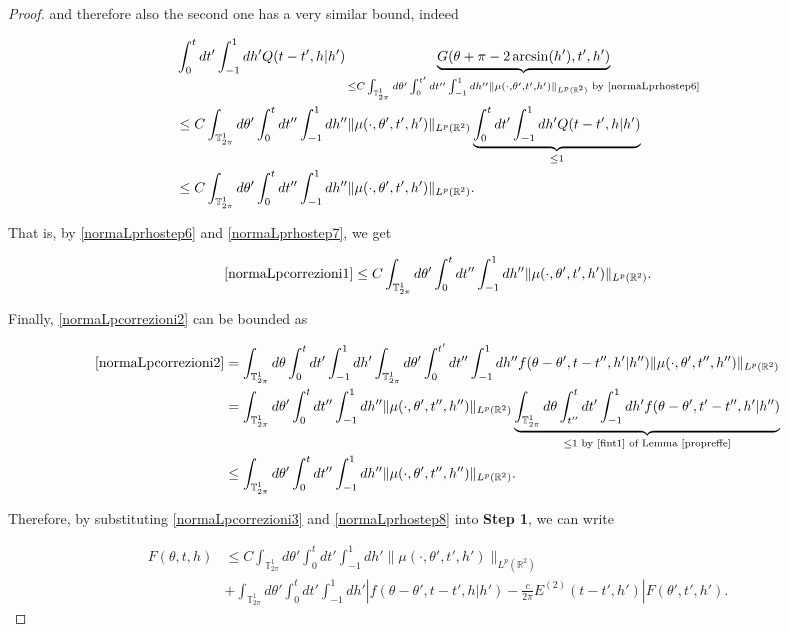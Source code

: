 \documentclass[a4paper,10pt,reqno]{amsart}
\numberwithin{equation}{subsection}
\numberwithin{figure}{subsection}
\begin{document}
\begin{proof}
and therefore also the second one has a very similar bound, indeed

\begin{align}
\nonumber&\int_0^tdt'\int_{-1}^1dh' Q(t-t',h|h')\underbrace{G(\theta+\pi-2\arcsin(h'),t',h')}_{\leq C\int_{\mathbb{T}^1_{2\pi}}d\theta'\int_0^{t'}dt''\int_{-1}^1dh''\|\mu(\cdot,\theta',t',h')\|_{L^p(\mathbb{R}^2)}\textrm{ by \eqref{normaLprhostep6}}}
\\
\nonumber&\leq C\int_{\mathbb{T}^1_{2\pi}}d\theta'\int_0^tdt''\int_{-1}^1dh''\|\mu(\cdot,\theta',t',h')\|_{L^p(\mathbb{R}^2)}\underbrace{\int_0^tdt'\int_{-1}^1dh' Q(t-t',h|h')}_{\leq1}
\\
\label{normaLprhostep7}&\leq C\int_{\mathbb{T}^1_{2\pi}}d\theta'\int_0^tdt''\int_{-1}^1dh''\|\mu(\cdot,\theta',t',h')\|_{L^p(\mathbb{R}^2)}.
\end{align}

That is, by \eqref{normaLprhostep6} and \eqref{normaLprhostep7}, we get

\begin{align}\label{normaLpcorrezioni3}
\eqref{normaLpcorrezioni1}\leq C\int_{\mathbb{T}^1_{2\pi}}d\theta'\int_0^tdt''\int_{-1}^1dh''\|\mu(\cdot,\theta',t',h')\|_{L^p(\mathbb{R}^2)}.
\end{align}

Finally, \eqref{normaLpcorrezioni2} can be bounded as

{\scriptsize\begin{align}
\nonumber\eqref{normaLpcorrezioni2}&=\int_{\mathbb{T}^1_{2\pi}}d\theta\int_0^tdt'\int_{-1}^1dh'\int_{\mathbb{T}^1_{2\pi}}d\theta'\int_0^{t'}dt''\int_{-1}^1dh'' f(\theta-\theta',t-t'',h'|h'')\|\mu(\cdot,\theta',t'',h'')\|_{L^p(\mathbb{R}^2)}
\\
\nonumber&=\int_{\mathbb{T}^1_{2\pi}}d\theta'\int_0^tdt''\int_{-1}^1dh''\|\mu(\cdot,\theta',t'',h'')\|_{L^p(\mathbb{R}^2)}\underbrace{\int_{\mathbb{T}^1_{2\pi}}d\theta\int_{t''}^tdt'\int_{-1}^1dh'f(\theta-\theta',t'-t'',h'|h'')}_{\leq1\textrm{ by \eqref{fint1} of Lemma \ref{propreffe}}}
\\
\label{normaLprhostep8}&\leq\int_{\mathbb{T}^1_{2\pi}}d\theta'\int_0^tdt''\int_{-1}^1dh''\|\mu(\cdot,\theta',t'',h'')\|_{L^p(\mathbb{R}^2)}.
\end{align}}

Therefore, by substituting \eqref{normaLpcorrezioni3} and \eqref{normaLprhostep8} into \textbf{Step 1}, we can write

{\small\begin{align}
\nonumber F(\theta,t,h)&\leq C\int_{\mathbb{T}^1_{2\pi}}d\theta'\int_0^tdt'\int_{-1}^1dh'\|\mu(\cdot,\theta',t',h')\|_{L^p(\mathbb{R}^2)}
\\
\label{normaLprhostep4}&+\int_{\mathbb{T}^1_{2\pi}}d\theta'\int_0^tdt'\int_{-1}^1dh'\left|f(\theta-\theta',t-t',h|h')-\frac{c}{2\pi}E^{(2)}(t-t',h')\right|F(\theta',t',h').
\end{align}}


\end{proof}
\end{document}
